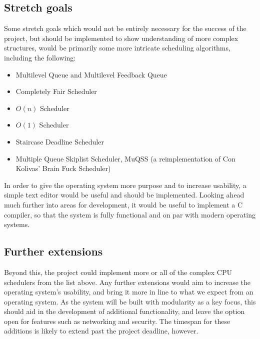 \documentclass[10pt,a4paper]{article}
\begin{document}
\subsection{Stretch goals}
Some stretch goals which would not be entirely necessary for the success of the
project, but should be implemented to show understanding of more complex
structures, would be primarily some more intricate scheduling algorithms,
including the following:
\begin{itemize}
    \item Multilevel Queue and Multilevel Feedback Queue
    \item Completely Fair Scheduler
    \item $O(n)$ Scheduler
    \item $O(1)$ Scheduler
    \item Staircase Deadline Scheduler
    \item Multiple Queue Skiplist Scheduler, MuQSS (a reimplementation of Con
        Kolivas' Brain Fuck Scheduler)
\end{itemize}

In order to give the operating system more purpose and to increase
usability, a simple text editor would be useful and should be implemented.
Looking ahead much further into areas for development, it would be useful to
implement a C compiler, so that the system is fully functional and on par with
modern operating systems.

\subsection{Further extensions}
Beyond this, the project could implement more or all  of the complex CPU
schedulers from the list above. Any further extensions would aim to increase the
operating system's usability, and bring it more in line to what we expect from
an operating system. As the system will be built with modularity as a key focus,
this should aid in the development of additional functionality, and leave the
option open for features such as networking and security. The timespan for these
additions is likely to extend past the project deadline, however.
\end{document}
